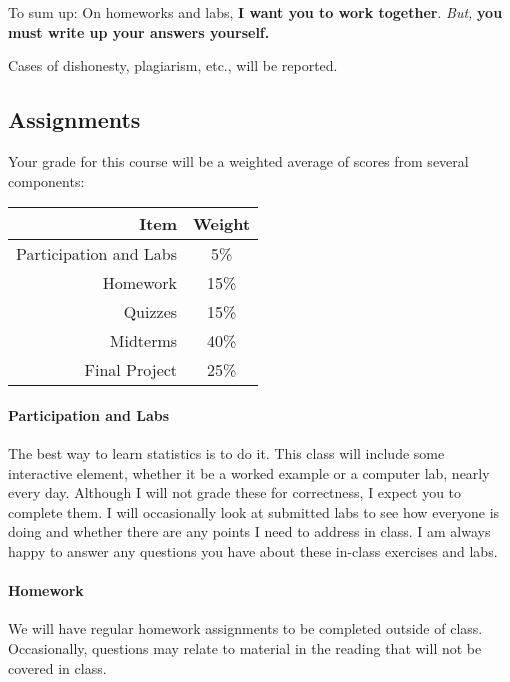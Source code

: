 \documentclass[11pt]{article}
\begin{document}
To sum up: On homeworks and labs, \textbf{I want you to work together}.  \emph{But,} \textbf{you must write up your answers yourself.}

Cases of dishonesty, plagiarism, etc., will be reported.

\subsection*{Assignments}

Your grade for this course will be a weighted average of scores from several components:

\begin{table}[!h]
\centering
\begin{tabular}{r c}
\toprule
Item & Weight \\
\midrule
Participation and Labs & 5\% \\
\cmidrule(r){1-2}
Homework & 15\% \\
\cmidrule(r){1-2}
Quizzes & 15\% \\
\cmidrule(r){1-2}
Midterms & 40\% \\
\cmidrule(r){1-2}
Final Project & 25\% \\
\bottomrule
\end{tabular}
\end{table}

\paragraph{Participation and Labs}
The best way to learn statistics is to do it.  This class will include some interactive element, whether it be a worked example or a computer lab, nearly every day.  Although I will not grade these for correctness, I expect you to complete them.  I will occasionally look at submitted labs to see how everyone is doing and whether there are any points I need to address in class.  I am always happy to answer any questions you have about these in-class exercises and labs.

\paragraph{Homework}
We will have regular homework assignments to be completed outside of class.
Occasionally, questions may relate to material in the reading that will not be covered in class.
\end{document}
